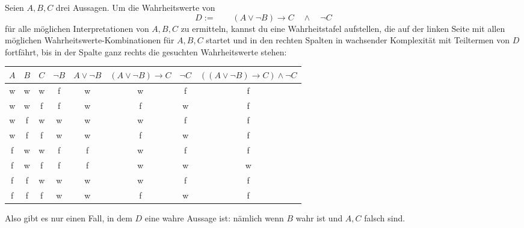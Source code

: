 \begin{bsp}
    Seien $A,B,C$ drei Aussagen. Um die Wahrheitswerte von
        \[ D:= \qquad (A\lor \neg B) \to C\quad \land\quad \neg C\]
    für alle möglichen Interpretationen von $A,B,C$ zu ermitteln, kannst du eine Wahrheitstafel aufstellen, die auf der linken Seite mit allen möglichen Wahrheitswerte-Kombinationen für $A,B,C$ startet und in den rechten Spalten in wachsender Komplexität mit Teiltermen von $D$ fortfährt, bis in der Spalte ganz rechts die gesuchten Wahrheitswerte stehen:
    \begin{center}
    \begin{tabular}{ccc|ccccc}
        $A$ & $B$ & $C$ & $\neg B$ & $A\lor \neg B$ & $(A\lor \neg B)\to C$ & $\neg C$ & $((A\lor \neg B) \to C)\land \neg C$ \\
        \hline
        w & w & w &  f & w & w & f & f \\
        w & w & f &  f & w & f & w & f \\
        w & f & w &  w & w & w & f & f \\
        w & f & f &  w & w & f & w & f \\
        f & w & w &  f & f & w & f & f \\
        f & w & f &  f & f & w & w & w \\
        f & f & w &  w & w & w & f & f \\
        f & f & f &  w & w & f & w & f
    \end{tabular}
    \end{center}
    Also gibt es nur einen Fall, in dem $D$ eine wahre Aussage ist: nämlich wenn $B$ wahr ist und $A,C$ falsch sind.
\end{bsp}



